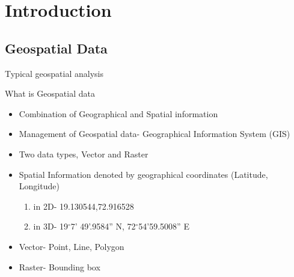 \section[Introduction]{Introduction}
\subsection[Geospatial Data]{Geospatial Data}





\begin{frame}{Typical geospatial analysis}




\end{frame}


\begin{frame}{What is Geospatial data}
	\begin{beamerboxesrounded}{}
		\begin{itemize}
			\item Combination of Geographical and Spatial information 
			\item Management of Geospatial data- Geographical Information System (GIS)
			\item Two data types, Vector and Raster 
			\item Spatial Information denoted by geographical coordinates (Latitude, Longitude) 
			\begin{enumerate}
				\item in 2D- 19.130544,72.916528
				\item in 3D- 19$^{\circ}$7' 49'.9584'' N, 72$^{\circ}$54'59.5008'' E
			\end{enumerate}
			
			\item Vector- Point, Line, Polygon
			\item Raster- Bounding box
		\end{itemize}
	\end{beamerboxesrounded}
\end{frame}


